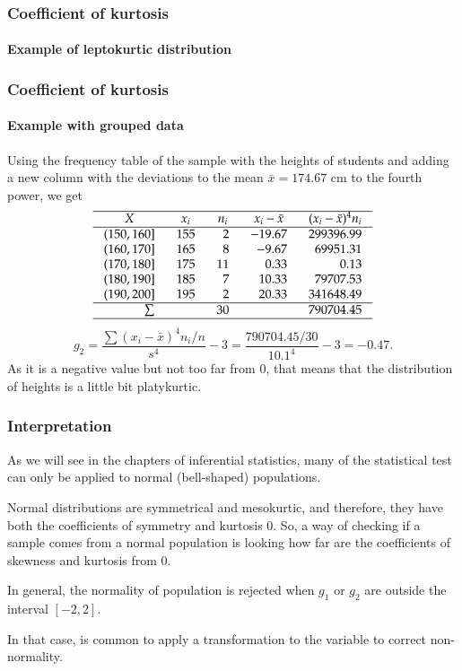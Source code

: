 \begin{frame}
\frametitle{Coefficient of kurtosis}
\framesubtitle{Example of leptokurtic distribution}
\begin{center}
\scalebox{0.6}{}
\end{center} 
\end{frame}


\begin{frame}
\frametitle{Coefficient of kurtosis}
\framesubtitle{Example with grouped data}
Using the frequency table of the sample with the heights of students and adding a new column with the deviations to
the mean $\bar x = 174.67$ cm to the fourth power, we get
\[
\setlength\arraycolsep{3mm}
\setlength\arrayrulewidth{0.5pt}
\begin{array}{rrrrr}
\hline
\multicolumn{1}{c}{X} & \multicolumn{1}{c}{x_i} & \multicolumn{1}{c}{n_i} & \multicolumn{1}{c}{x_i-\bar x} & \multicolumn{1}{c}{(x_i-\bar x)^4 n_i} \\
\hline
(150,160] & 155 & 2 & -19.67 & 299396.99\\
(160,170] & 165 & 8 & -9.67 & 69951.31\\
(170,180] & 175 & 11 & 0.33 & 0.13\\
(180,190] & 185 & 7 & 10.33 & 79707.53\\
(190,200] & 195 & 2 & 20.33 & 341648.49\\
\hline
\sum &  & 30 & & 790704.45 \\
\hline
\end{array}
\]
\[
g_2 = \frac{\sum (x_i-\bar x)^4n_i/n}{s^4} - 3 = \frac{790704.45/30}{10.1^4}-3 = -0.47.
\]
As it is a negative value but not too far from 0, that means that the distribution of heights is a little
bit platykurtic.
\end{frame}


\begin{frame}
\frametitle{Interpretation }
As we will see in the chapters of inferential statistics, many of the statistical test can only be applied to normal
(bell-shaped) populations. 

Normal distributions are symmetrical and mesokurtic, and therefore, they have both the coefficients of symmetry and
kurtosis 0. So, a way of checking if a sample comes from a normal population is looking how far are the coefficients of
skewness and kurtosis from 0. 
 
In general, the normality of population is rejected when $g_1$ or $g_2$ are outside the interval $[-2,2]$.

In that case, is common to apply a transformation to the variable to correct non-normality. 
\end{frame}


